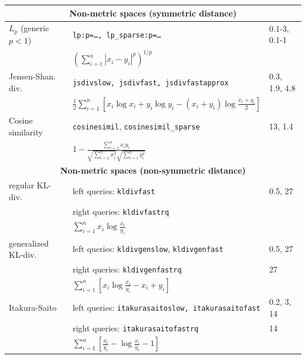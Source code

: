\documentclass[runningheads,a4paper]{llncs}
\newcommand{\ttt}[1]{\texttt{#1}}
\begin{document}
{\begin{table}
\begin{tabular}{l@{\hspace{2mm}}l@{\hspace{2mm}}l}
\toprule
\multicolumn{3}{c}{\textbf{Non-metric spaces (symmetric distance)}}  \\
\toprule
$L_p$ (generic $p < 1$)& \ttt{lp:p=\ldots, lp\_sparse:p=\ldots}                     &  0.1-3, 0.1-1 \\
                              & $\left(\sum_{i=1}^n |x_i-y_i|^p\right)^{1/p}$  &   \\
\cmidrule(l){1-3} 
Jensen-Shan. div. &\ttt{jsdivslow, jsdivfast, jsdivfastapprox} &   0.3, 1.9, 4.8 \\
                          & $\frac{1}{2}\sum_{i=1}^n \left[x_i \log x_i + y_i \log y_i  - (x_i+y_i)\log \frac{x_i +y_i}{2}\right]$ & \\
\cmidrule(l){1-3} 
Cosine similarity & \ttt{cosinesimil}, \ttt{cosinesimil\_sparse} & { 13, 1.4 } \\
                        & $1-\frac{\sum_{i=1}^n x_i y_i}{\sqrt{\sum_{i=1}^n x_i^2}\sqrt{\sum_{i=1}^n y_i^2 }}$   & \vspace{1em} \\
\toprule
\multicolumn{3}{c}{\textbf{Non-metric spaces (non-symmetric distance)}}  \\
\toprule
regular KL-div. & left queries: \ttt{kldivfast}       & 0.5, 27 \\
                       & right queries: \ttt{kldivfastrq}    &  \\
                       & $\sum_{i=1}^n   x_i \log \frac{x_i}{y_i}$  & \\ 
\cmidrule(l){1-3} 
generalized KL-div. & left queries: \ttt{kldivgenslow}, \ttt{kldivgenfast} & 0.5, 27    \\
                           & right queries: \ttt{kldivgenfastrq} & 27    \\
                           & $\sum_{i=1}^n \left[  x_i \log \frac{x_i}{y_i} -   x_i +   y_i \right]$   &   \\
\cmidrule(l){1-3} 
Itakura-Saito & left queries: \ttt{itakurasaitoslow, itakurasaitofast}   & 0.2, 3, 14 \\
              & right queries: \ttt{itakurasaitofastrq}                  & 14         \\
              & $\sum_{i=1}^n \left[ \frac{ x_i}{y_i} - \log \frac{x_i}{y_i}  -1 \right]$ \\
\toprule
\end{tabular}
\end{table}

}
\end{document}
